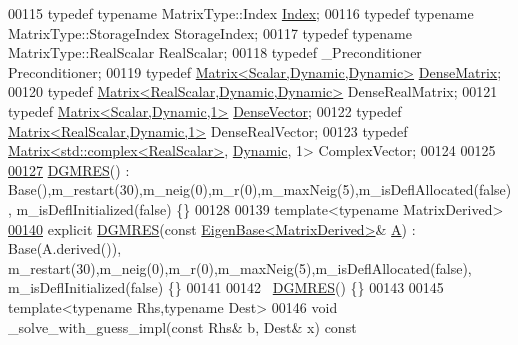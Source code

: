 \begin{DoxyCode}
00115     \textcolor{keyword}{typedef} \textcolor{keyword}{typename} MatrixType::Index \hyperlink{namespace_eigen_a62e77e0933482dafde8fe197d9a2cfde}{Index};
00116     \textcolor{keyword}{typedef} \textcolor{keyword}{typename} MatrixType::StorageIndex StorageIndex;
00117     \textcolor{keyword}{typedef} \textcolor{keyword}{typename} MatrixType::RealScalar RealScalar;
00118     \textcolor{keyword}{typedef} \_Preconditioner Preconditioner;
00119     \textcolor{keyword}{typedef} \hyperlink{group___core___module}{Matrix<Scalar,Dynamic,Dynamic>} 
      \hyperlink{group___core___module}{DenseMatrix}; 
00120     \textcolor{keyword}{typedef} \hyperlink{group___core___module_class_eigen_1_1_matrix}{Matrix<RealScalar,Dynamic,Dynamic>} DenseRealMatrix; 
00121     \textcolor{keyword}{typedef} \hyperlink{group___core___module}{Matrix<Scalar,Dynamic,1>} \hyperlink{group___core___module}{DenseVector};
00122     \textcolor{keyword}{typedef} \hyperlink{group___core___module}{Matrix<RealScalar,Dynamic,1>} DenseRealVector; 
00123     \textcolor{keyword}{typedef} \hyperlink{group___core___module_class_eigen_1_1_matrix}{Matrix<std::complex<RealScalar>}, 
      \hyperlink{namespace_eigen_ad81fa7195215a0ce30017dfac309f0b2}{Dynamic}, 1> ComplexVector;
00124  
00125     
\hyperlink{class_eigen_1_1_d_g_m_r_e_s_a17bd25826b56c39bc7cc4ce8fbf8a848}{00127}   \hyperlink{class_eigen_1_1_d_g_m_r_e_s_a17bd25826b56c39bc7cc4ce8fbf8a848}{DGMRES}() : Base(),m\_restart(30),m\_neig(0),m\_r(0),m\_maxNeig(5),m\_isDeflAllocated(false),
      m\_isDeflInitialized(false) \{\}
00128 
00139   \textcolor{keyword}{template}<\textcolor{keyword}{typename} MatrixDerived>
\hyperlink{class_eigen_1_1_d_g_m_r_e_s_a800fcf37c0ac66f76d5c070e4aeae2a7}{00140}   \textcolor{keyword}{explicit} \hyperlink{class_eigen_1_1_d_g_m_r_e_s_a800fcf37c0ac66f76d5c070e4aeae2a7}{DGMRES}(\textcolor{keyword}{const} \hyperlink{group___core___module_struct_eigen_1_1_eigen_base}{EigenBase<MatrixDerived>}& 
      \hyperlink{group___core___module_class_eigen_1_1_matrix}{A}) : Base(A.derived()), m\_restart(30),m\_neig(0),m\_r(0),m\_maxNeig(5),m\_isDeflAllocated(false),
      m\_isDeflInitialized(false) \{\}
00141 
00142   ~\hyperlink{class_eigen_1_1_d_g_m_r_e_s}{DGMRES}() \{\}
00143   
00145   \textcolor{keyword}{template}<\textcolor{keyword}{typename} Rhs,\textcolor{keyword}{typename} Dest>
00146   \textcolor{keywordtype}{void} \_solve\_with\_guess\_impl(\textcolor{keyword}{const} Rhs& b, Dest& x)\textcolor{keyword}{ const}

\end{DoxyCode}
